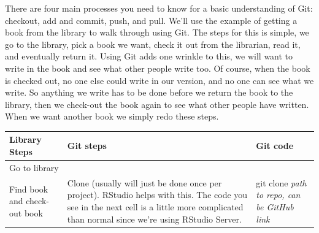\documentclass[
  12pt,
]{book}
\begin{document}
There are four main processes you need to know for a basic understanding of Git: checkout, add and commit, push, and pull. We'll use the example of getting a book from the library to walk through using Git. The steps for this is simple, we go to the library, pick a book we want, check it out from the librarian, read it, and eventually return it. Using Git adds one wrinkle to this, we will want to write in the book and see what other people write too. Of course, when the book is checked out, no one else could write in our version, and no one can see what we write. So anything we write has to be done before we return the book to the library, then we check-out the book again to see what other people have written. When we want another book we simply redo these steps.

\begin{longtable}[]{@{}lll@{}}
\toprule
\begin{minipage}[b]{0.30\columnwidth}\raggedright
Library Steps\strut
\end{minipage} & \begin{minipage}[b]{0.30\columnwidth}\raggedright
Git steps\strut
\end{minipage} & \begin{minipage}[b]{0.30\columnwidth}\raggedright
Git code\strut
\end{minipage}\tabularnewline
\midrule
\endhead
\begin{minipage}[t]{0.30\columnwidth}\raggedright
Go to library\strut
\end{minipage} & \begin{minipage}[t]{0.30\columnwidth}\raggedright
\strut
\end{minipage} & \begin{minipage}[t]{0.30\columnwidth}\raggedright
\strut
\end{minipage}\tabularnewline
\begin{minipage}[t]{0.30\columnwidth}\raggedright
Find book and check-out book\strut
\end{minipage} & \begin{minipage}[t]{0.30\columnwidth}\raggedright
Clone (usually will just be done once per project). RStudio helps with this. The code you see in the next cell is a little more complicated than normal since we're using RStudio Server.\strut
\end{minipage} & \begin{minipage}[t]{0.30\columnwidth}\raggedright
git clone \emph{path to repo, can be GitHub link}\strut
\end{minipage}\tabularnewline

\end{longtable}
\end{document}
